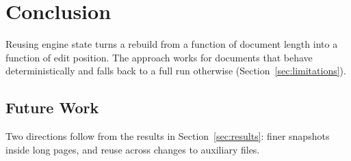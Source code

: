 \chapter{Conclusion}
\label{chap:conclusion}

Reusing engine state turns a rebuild from a function of document length into
a function of edit position. The approach works for documents that behave
deterministically and falls back to a full run otherwise
(Section~\ref{sec:limitations}).

\section{Future Work}
\label{sec:future-work}

Two directions follow from the results in Section~\ref{sec:results}: finer
snapshots inside long pages, and reuse across changes to auxiliary files.
